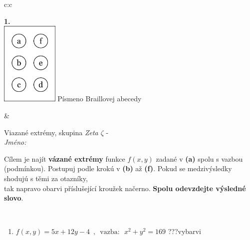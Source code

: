 \documentclass[10pt]{report}
\begin{document}
\begin{tabular}{c:c}
\begin{minipage}[c][104.5mm][t]{0.5\linewidth}
\begin{center}
\begin{minipage}{0.79\linewidth}
\begin{center}
\begin{varwidth}{\linewidth}
\begin{enumerate}
\end{enumerate}
\end{varwidth}
\end{center}
\end{minipage}
\begin{minipage}{0.20\linewidth}
\begin{center}
{\Huge\bfseries 1.} \\[2mm]
\includegraphics[height=40mm]{../images/braille.png}
{\small Písmeno Braillovej abecedy}
\end{center}
\end{minipage}
\end{center}
\end{minipage}
&
\begin{minipage}[c][104.5mm][t]{0.5\linewidth}
\begin{center}
\vspace{7mm}
{\huge Viazané extrémy, skupina \textit{Zeta $\zeta$} -}\\[5mm]
\textit{Jméno:}\phantom{xxxxxxxxxxxxxxxxxxxxxxxxxxxxxxxxxxxxxxxxxxxxxxxxxxxxxxxxxxxxxxxxx}\\[5mm]
\begin{minipage}{0.95\linewidth}
\begin{center}
Cílem je najít \textbf{vázané extrémy} funkce $f(x,y)$ zadané v \textbf{(a)} spolu s vazbou (podmínkou). Postupuj podle krokú v \textbf{(b)} až \textbf{(f)}. Pokud se medzivýsledky shodujú s těmi za otazníky,\\tak napravo obarvi příslušející kroužek načerno. \textbf{Spolu odevzdejte výsledné slovo}.
\end{center}
\end{minipage}
\\[1mm]
\begin{minipage}{0.79\linewidth}
\begin{center}
\begin{varwidth}{\linewidth}
\begin{enumerate}
\normalsize
\item $f(x,y)=5x+12y-4 \enspace , \enspace \mathrm{vazba:} \enspace x^2+y^2=169$\quad \dotfill\; ???\;\dotfill \quad vybarvi

\end{enumerate}
\end{varwidth}
\end{center}
\end{minipage}
\end{center}
\end{minipage}
\end{tabular}
\end{document}
